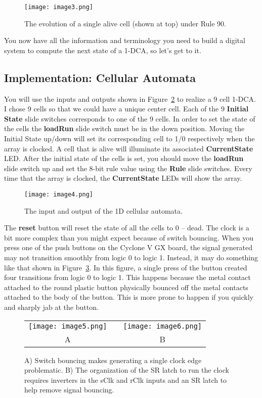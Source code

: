 \begin{figure}[ht]
\texttt{[image: image3.png]}
\caption{The evolution of a single alive cell (shown at top) under Rule 90.}
\label{fig:caEvolution}
\end{figure}

You now have all the information and terminology you need to build a
digital system to compute the next state of a 1-DCA, so let's get to it.

\subsection{Implementation: Cellular Automata}

You will use the inputs and outputs shown in Figure~\ref{fig:caDevBoard} to realize a
9 cell 1-DCA. I chose 9 cells so that we could have a unique center
cell. Each of the 9 \textbf{Initial State} slide switches corresponds to
one of the 9 cells. In order to set the state of the cells the
\textbf{loadRun} slide switch must be in the down position. Moving the
Initial State up/down will set its corresponding cell to 1/0
respectively when the array is clocked. A cell that is alive will
illuminate its associated \textbf{CurrentState} LED. After the initial
state of the cells is set, you should move the \textbf{loadRun} slide
switch up and set the 8-bit rule value using the \textbf{Rule} slide
switches. Every time that the array is clocked, the
\textbf{CurrentState} LEDs will show the array.

\begin{figure}[ht]
\texttt{[image: image4.png]}
\caption{The input and output of the 1D cellular automata.}
\label{fig:caDevBoard}
\end{figure}

The \textbf{reset} button will reset the state of all the cells to 0 --
dead. The clock is a bit more complex than you might expect because of
switch bouncing. When you press one of the push buttons on the Cyclone V
GX board, the signal generated may not transition smoothly from logic 0
to logic 1. Instead, it may do something like that shown in Figure~\ref{fig:caSwitchBounce}. In
this figure, a single press of the button created four transitions from
logic 0 to logic 1. This happens because the metal contact attached to
the round plastic button physically bounced off the metal contacts
attached to the body of the button. This is more prone to happen if you
quickly and sharply jab at the button.

\begin{figure}[ht]
\begin{tabular}{ccc }
\texttt{[image: image5.png]} &  & \texttt{[image: image6.png]} \\
A  & & B \\ 
\end{tabular}
\caption{A) Switch bouncing makes generating a single clock edge problematic.
B) The organization of the SR latch to run the clock requires
inverters in the sClk and rClk inputs and an SR latch to help remove
signal bouncing.}
\label{fig:caSwitchBounce}
\end{figure}

